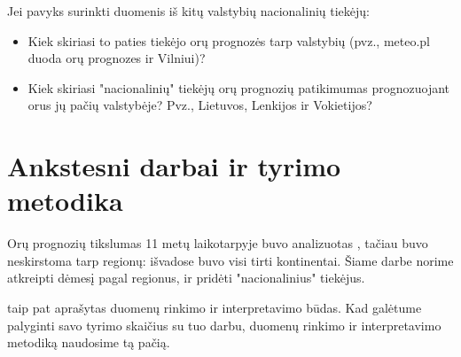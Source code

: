 \documentclass{article}
\begin{document}
Jei pavyks surinkti duomenis iš kitų valstybių nacionalinių tiekėjų:
\begin{itemize}
    \item Kiek skiriasi to paties tiekėjo orų prognozės tarp valstybių (pvz.,
        meteo.pl duoda orų prognozes ir Vilniui)?
    \item Kiek skiriasi "nacionalinių" tiekėjų orų prognozių patikimumas
        prognozuojant orus jų pačių valstybėje? Pvz., Lietuvos, Lenkijos ir
        Vokietijos?
\end{itemize}

\section{Ankstesni darbai ir tyrimo metodika}

Orų prognozių tikslumas 11 metų laikotarpyje buvo analizuotas
\cite{rose2017analysis}, tačiau buvo neskirstoma tarp regionų: išvadose buvo
visi tirti kontinentai. Šiame darbe norime atkreipti dėmesį pagal regionus, ir
pridėti "nacionalinius" tiekėjus.

\cite{rose2017analysis} taip pat aprašytas duomenų rinkimo ir interpretavimo
būdas. Kad galėtume palyginti savo tyrimo skaičius su tuo darbu, duomenų
rinkimo ir interpretavimo metodiką naudosime tą pačią.

{}

\end{document}
